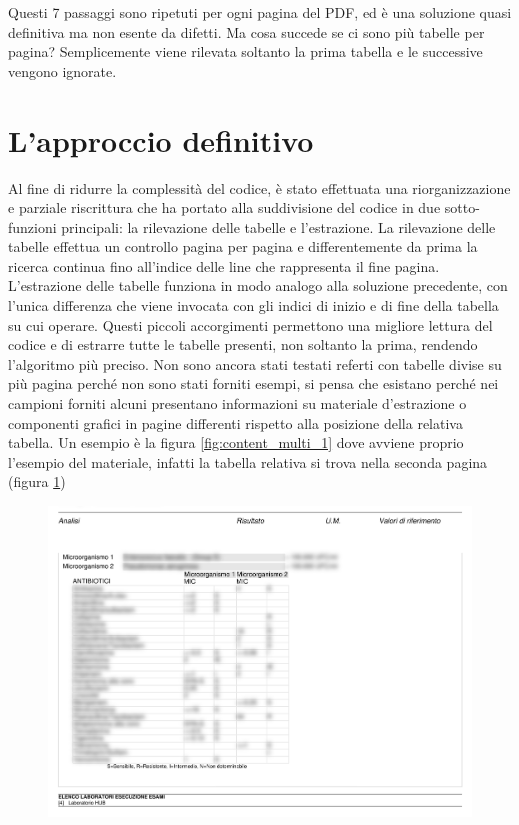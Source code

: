 Questi 7 passaggi sono ripetuti per ogni pagina del PDF, ed è una soluzione quasi definitiva ma non esente da difetti. Ma cosa succede se ci sono più tabelle per pagina? Semplicemente viene rilevata soltanto la prima tabella e le successive vengono ignorate.
\section{L'approccio definitivo}
Al fine di ridurre la complessità del codice, è stato effettuata una riorganizzazione e parziale riscrittura che ha portato alla suddivisione del codice in due sotto-funzioni principali: la rilevazione delle tabelle e l'estrazione.
La rilevazione delle tabelle effettua un controllo pagina per pagina e differentemente da prima la ricerca continua fino all'indice delle line che rappresenta il fine pagina.
L'estrazione delle tabelle funziona in modo analogo alla soluzione precedente, con l'unica differenza che viene invocata con gli indici di inizio e di fine della tabella su cui operare. 
Questi piccoli accorgimenti permettono una migliore lettura del codice e di estrarre tutte le tabelle presenti, non soltanto la prima, rendendo l'algoritmo più preciso.
Non sono ancora stati testati referti con tabelle divise su più pagina perché non sono stati forniti esempi, si pensa che esistano perché nei campioni forniti alcuni presentano informazioni su materiale d'estrazione o componenti grafici in pagine differenti rispetto alla posizione della relativa tabella. Un esempio è la figura \ref{fig:content_multi_1} dove avviene proprio l'esempio del materiale, infatti la tabella relativa si trova nella seconda pagina (figura \ref{fig:content_multi_2})
\newpage
\begin{figure}[h!]
	\centering
	\includegraphics[width=.99\columnwidth]{images/content_multi_p2.png}
	\caption{\textit{}}
	\label{fig:content_multi_2}
\end{figure} 

